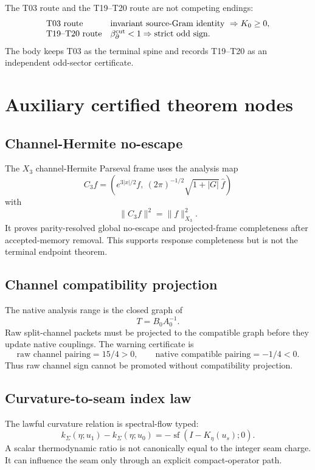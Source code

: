 \documentclass[11pt]{article}
\newcommand{\kSigma}{k_\Sigma}
\newcommand{\sf}{\operatorname{sf}}
\begin{document}
The T03 route and the T19--T20 route are not competing endings:
\[
\begin{array}{ll}
\text{T03 route} & \text{invariant source-Gram identity }\Rightarrow K_0\ge0,\\
\text{T19--T20 route} & \beta_{\partial}^{\rm cut}<1 \Rightarrow \text{strict odd sign}.
\end{array}
\]
The body keeps T03 as the terminal spine and records T19--T20 as an independent odd-sector certificate.

\section{Auxiliary certified theorem nodes}

\subsection{Channel-Hermite no-escape}

The \(X_3\) channel-Hermite Parseval frame uses the analysis map
\[
C_3f=\left(e^{3|x|/2}f,\ (2\pi)^{-1/2}\sqrt{1+|G|}\,\widehat f\right)
\]
with
\[
\|C_3f\|^2=\|f\|_{X_3}^2.
\]
It proves parity-resolved global no-escape and projected-frame completeness after accepted-memory removal.  This supports response completeness but is not the terminal endpoint theorem.

\subsection{Channel compatibility projection}

The native analysis range is the closed graph of
\[
T=B_0A_0^{-1}.
\]
Raw split-channel packets must be projected to the compatible graph before they update native couplings.  The warning certificate is
\[
\text{raw channel pairing}=15/4>0,
\qquad
\text{native compatible pairing}=-1/4<0.
\]
Thus raw channel sign cannot be promoted without compatibility projection.

\subsection{Curvature-to-seam index law}

The lawful curvature relation is spectral-flow typed:
\[
\kSigma(\eta;u_1)-\kSigma(\eta;u_0)
=-\sf(I-K_\eta(u_s);0).
\]
A scalar thermodynamic ratio is not canonically equal to the integer seam charge.  It can influence the seam only through an explicit compact-operator path.
\end{document}
